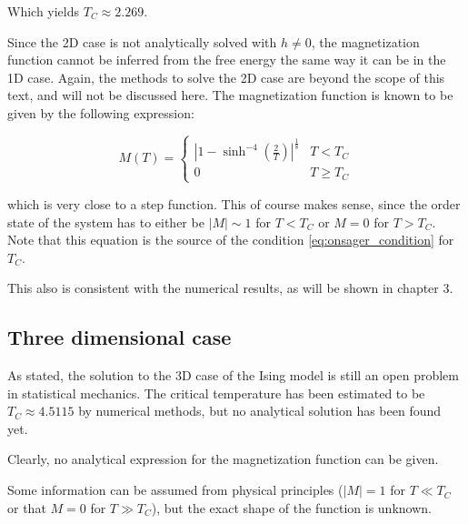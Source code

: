 Which yields $T_C \approx 2.269$.

\br

Since the 2D case is not analytically solved with $h \neq 0$, the magnetization function cannot be inferred from the free energy the same way it can be in the 1D case. Again, the methods to solve the 2D case are beyond the scope of this text, and will not be discussed here. The magnetization function is known to be given by the following expression:

\begin{equation}
  M(T) = 
  \begin{cases} 
    |1 - \sinh^{-4} \left( \frac{2}{T} \right)|^{\frac{1}{8}} & T < T_C \\ 
    0 &  T \geq T_C 
  \end{cases}
\end{equation}

which is very close to a step function. This of course makes sense, since the order state of the system has to either be $|M| \sim 1$ for $T < T_C$ or $M = 0$ for $T > T_C$. Note that this equation is the source of the condition \ref{eq:onsager_condition} for $T_C$.

This also is consistent with the numerical results, as will be shown in chapter 3.

\subsection{Three dimensional case}

As stated, the solution to the 3D case of the Ising model is still an open problem in statistical mechanics. The critical temperature has been estimated to be $T_C \approx 4.5115$ by numerical methods, but no analytical solution has been found yet.

\br

Clearly, no analytical expression for the magnetization function can be given.

Some information can be assumed from physical principles ($|M| = 1$ for $T \ll T_C$ or that $M = 0$ for $T \gg T_C$), but the exact shape of the function is unknown.




\clearpage